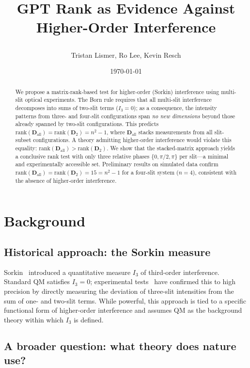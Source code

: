 \documentclass[12pt]{article}
\title{\textbf{GPT Rank as Evidence Against Higher-Order Interference}\\[0.5em]
\author{Tristan Lismer, Ro Lee, Kevin Resch}}
\date{\today}
\begin{document}
\maketitle

\begin{abstract}
We propose a matrix-rank-based test for higher-order (Sorkin) interference using
multi-slit optical experiments.  The Born rule requires that all multi-slit
interference decomposes into sums of two-slit terms ($I_3 = 0$); as a consequence,
the intensity patterns from three- and four-slit configurations span \emph{no new
dimensions} beyond those already spanned by two-slit configurations.  This predicts
$\mathrm{rank}(\mathbf{D}_{\mathrm{all}}) = \mathrm{rank}(\mathbf{D}_2) = n^2 - 1$,
where $\mathbf{D}_{\mathrm{all}}$ stacks measurements from all slit-subset
configurations.  A theory admitting higher-order interference would violate this
equality: $\mathrm{rank}(\mathbf{D}_{\mathrm{all}}) > \mathrm{rank}(\mathbf{D}_2)$.
We show that the stacked-matrix approach yields a conclusive rank test with only
three relative phases $\{0,\pi/2,\pi\}$ per slit---a minimal and experimentally
accessible set.  Preliminary results on simulated data confirm
$\mathrm{rank}(\mathbf{D}_{\mathrm{all}}) = \mathrm{rank}(\mathbf{D}_2) = 15 = n^2-1$
for a four-slit system ($n=4$), consistent with the absence of higher-order
interference.
\end{abstract}

\section{Background}

\subsection{Historical approach: the Sorkin measure}

Sorkin~\cite{sorkin1994} introduced a quantitative measure $I_3$ of third-order
interference.  Standard QM satisfies $I_3 = 0$; experimental tests~\cite{sinha2010}
have confirmed this to high precision by directly measuring the deviation of
three-slit intensities from the sum of one- and two-slit terms.  While powerful,
this approach is tied to a specific functional form of higher-order interference
and assumes QM as the background theory within which $I_3$ is defined.

\subsection{A broader question: what theory does nature use?}
\end{document}
